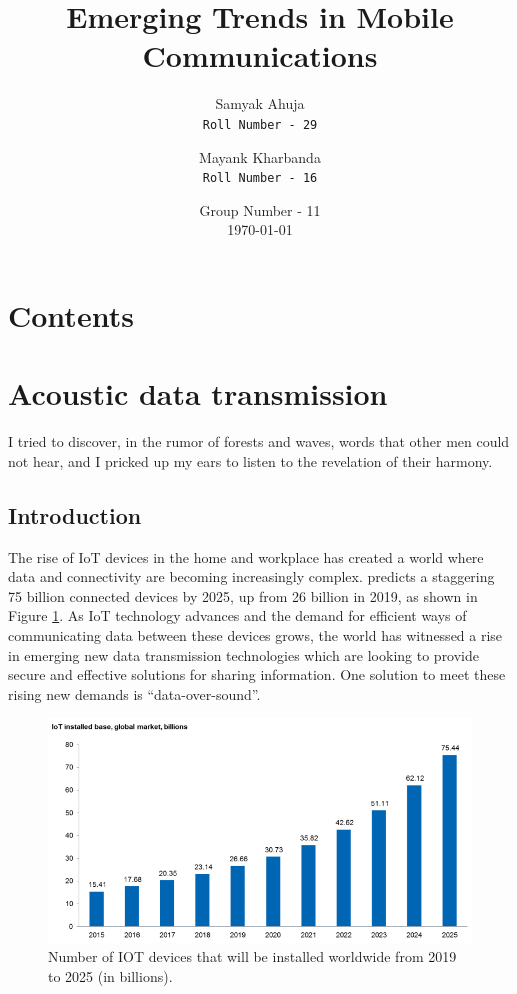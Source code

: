 \documentclass[notitlepage,hidelinks]{article}
\title{Emerging Trends in Mobile Communications}
\author{
    Samyak Ahuja \\
    \texttt{Roll Number - 29}
    \and
    Mayank Kharbanda \\
    \texttt{Roll Number - 16}
}
\date{%
    Group Number - 11\\[2ex]%
    \today
}
\makeatletter
\newcommand*{\toccontents}{\@starttoc{toc}}
\makeatother
\begin{document}
\vspace{0.5in}
\maketitle

\vspace{1in}
\section*{Contents}
\toccontents
\newpage


\section{Acoustic data transmission}
\epigraph{ I tried to discover, in the rumor of forests and waves, words
that other men could not hear, and I pricked up my ears to listen to the
revelation of their harmony.}{\textcite{november05}}

\subsection{Introduction}
The rise of IoT devices in the home and workplace has created a world where
data and connectivity are becoming increasingly complex. \textcite{ihs16}
predicts a staggering 75 billion connected devices by 2025, up from 26 billion
in 2019, as shown in Figure \ref{fig:ihs_iot}.  As IoT technology advances and the
demand for efficient ways of communicating data between these devices grows,
the world has witnessed a rise in emerging new data transmission technologies
which are looking to provide secure and effective solutions for sharing
information. One solution to meet these rising new demands is “data-over-sound”.

\begin{figure}[!h]
  \includegraphics[width=\linewidth]{res/iot_market_trend.png}
    \caption{Number of IOT devices that will be installed worldwide from 2019
    to 2025 (in billions).}
  \label{fig:ihs_iot}
\end{figure}
\end{document}
